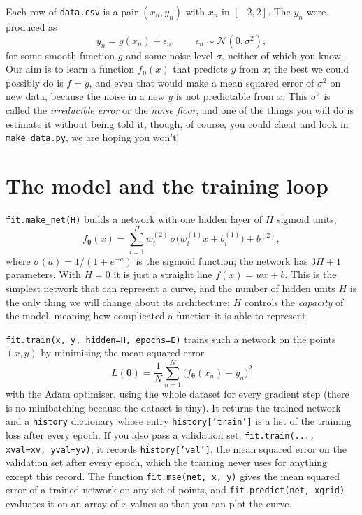 \documentclass[11pt,a4paper]{article}
\begin{document}
Each row of \texttt{data.csv} is a pair $(x_n, y_n)$ with $x_n$ in $[-2, 2]$. The $y_n$ were produced as
\[
y_n = g(x_n) + \epsilon_n, \qquad \epsilon_n \sim \mathcal{N}(0, \sigma^2),
\]
for some smooth function $g$ and some noise level $\sigma$, neither of
which you know. Our aim is to learn a function $f_{\bm\theta}(x)$ that
predicts $y$ from $x$; the best we could possibly do is $f = g$, and
even that would make a mean squared error of $\sigma^2$ on new data,
because the noise in a new $y$ is not predictable from $x$. This
$\sigma^2$ is called the \emph{irreducible error} or the \emph{noise
floor}, and one of the things you will do is estimate it without being
told it, though, of course, you could cheat and look in
\texttt{make\_data.py}, we are hoping you won't!

\section*{The model and the training loop}

\texttt{fit.make\_net(H)} builds a network with one hidden layer of $H$ sigmoid units,
\[
f_{\bm\theta}(x) = \sum_{i=1}^{H} w^{(2)}_i\, \sigma\!\big(w^{(1)}_i x + b^{(1)}_i\big) + b^{(2)},
\]
where $\sigma(a) = 1/(1+e^{-a})$ is the sigmoid function; the network has $3H + 1$ parameters. With $H = 0$ it is just a straight line
$f(x) = w x + b$. This is the simplest network that can represent a
curve, and the number of hidden units $H$ is the only thing we will
change about its architecture; $H$ controls the \emph{capacity} of the
model, meaning how complicated a function it is able to represent.

\texttt{fit.train(x, y, hidden=H, epochs=E)} trains such a network on
the points $(x, y)$ by minimising the mean squared error
\[
L(\bm\theta) = \frac{1}{N}\sum_{n=1}^{N}\big(f_{\bm\theta}(x_n) - y_n\big)^2
\]
with the Adam optimiser, using the whole dataset for every gradient step (there is no minibatching because the dataset is tiny). It returns the trained network and a \texttt{history} dictionary whose entry \texttt{history['train']} is a list of the training loss after every epoch. If you also pass a validation set, \texttt{fit.train(..., xval=xv, yval=yv)}, it records \texttt{history['val']}, the mean squared error on the validation set after every epoch, which the training never uses for anything except this record. The function \texttt{fit.mse(net, x, y)} gives the mean squared error of a trained network on any set of points, and \texttt{fit.predict(net, xgrid)} evaluates it on an array of $x$ values so that you can plot the curve.
\end{document}
